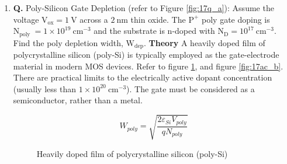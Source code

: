 \documentclass[main.tex]{subfiles}
\begin{document}
\begin{enumerate}
\begin{enumerate}
        \item \textbf{Q.} Poly-Silicon Gate Depletion (refer to Figure \ref{fig:17q_a}): Assume the voltage $\mathrm{V}_{\mathrm{ox}} = \qty{1}{\volt}$ across a $\qty{2}{\nano\meter}$ thin  oxide. The $\mathrm{P}^{+}$ poly gate doping is $\mathrm{N}_{\text {poly }}=1 \times 10^{19} \mathrm{~cm}^{-3}$ and the substrate is n-doped with $\mathrm{N}_{\mathrm{D}}=10^{17} \mathrm{~cm}^{-3}$. Find the poly depletion width, $\mathrm{W}_{\mathrm{dep }}$. \textbf{Theory} A heavily doped film of polycrystalline silicon (poly-Si) is typically employed as the gate-electrode material in modern MOS devices. Refer to figure \ref{fig:17q_b}, and figure \ref{fig:17ac_b}. There are practical limits to the electrically active dopant concentration (usually less than $1 \times 10^{20} \mathrm{~cm}^{-3}$). The gate must be considered as a semiconductor, rather than a metal. 
      
        $$
        W_{poly}=\sqrt{\frac{2 \varepsilon_{Si} V_{poly}}{q N_{poly}}}
        $$

        \begin{figure}
        \centering{}
        \caption{Heavily doped film of polycrystalline silicon (poly-Si)}
        \label{fig:17q_b}
        \end{figure}


\end{enumerate}
\end{enumerate}
\end{document}
